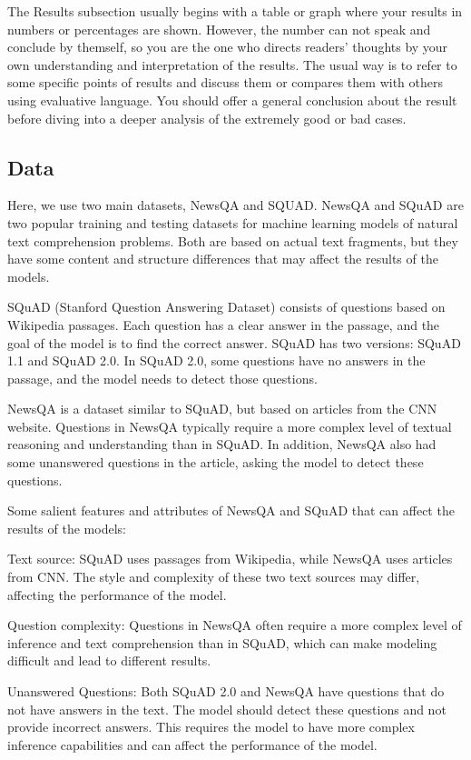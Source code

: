 \documentclass[11pt]{article}
\begin{document}
The Results subsection usually begins with a table or graph where your results in numbers or percentages are shown.
However, the number can not speak and conclude by themself, so you are the one who directs readers' thoughts by your own understanding and interpretation of the results.
The usual way is to refer to some specific points of results and discuss them or compares them with others using evaluative language.
You should offer a general conclusion about the result before diving into a deeper analysis of the extremely good or bad cases.

\subsection{Data}
Here, we use two main datasets, NewsQA and SQUAD.
NewsQA and SQuAD are two popular training and testing datasets for machine learning models of natural text comprehension problems. Both are based on actual text fragments, but they have some content and structure differences that may affect the results of the models.

SQuAD (Stanford Question Answering Dataset) consists of questions based on Wikipedia passages. Each question has a clear answer in the passage, and the goal of the model is to find the correct answer. SQuAD has two versions: SQuAD 1.1 and SQuAD 2.0. In SQuAD 2.0, some questions have no answers in the passage, and the model needs to detect those questions.

NewsQA is a dataset similar to SQuAD, but based on articles from the CNN website. Questions in NewsQA typically require a more complex level of textual reasoning and understanding than in SQuAD. In addition, NewsQA also had some unanswered questions in the article, asking the model to detect these questions.

Some salient features and attributes of NewsQA and SQuAD that can affect the results of the models:

Text source: SQuAD uses passages from Wikipedia, while NewsQA uses articles from CNN. The style and complexity of these two text sources may differ, affecting the performance of the model.

Question complexity: Questions in NewsQA often require a more complex level of inference and text comprehension than in SQuAD, which can make modeling difficult and lead to different results.

Unanswered Questions: Both SQuAD 2.0 and NewsQA have questions that do not have answers in the text. The model should detect these questions and not provide incorrect answers. This requires the model to have more complex inference capabilities and can affect the performance of the model.
\end{document}
